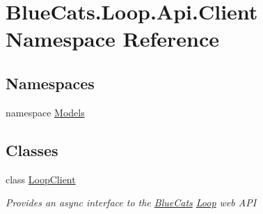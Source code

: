 \hypertarget{namespace_blue_cats_1_1_loop_1_1_api_1_1_client}{}\section{Blue\+Cats.\+Loop.\+Api.\+Client Namespace Reference}
\label{namespace_blue_cats_1_1_loop_1_1_api_1_1_client}
\subsection*{Namespaces}
\begin{DoxyCompactItemize}
\item 
namespace \mbox{\hyperlink{namespace_blue_cats_1_1_loop_1_1_api_1_1_client_1_1_models}{Models}}
\end{DoxyCompactItemize}
\subsection*{Classes}
\begin{DoxyCompactItemize}
\item 
class \mbox{\hyperlink{class_blue_cats_1_1_loop_1_1_api_1_1_client_1_1_loop_client}{Loop\+Client}}
\begin{DoxyCompactList}\small\item\em Provides an async interface to the \mbox{\hyperlink{namespace_blue_cats}{Blue\+Cats}} \mbox{\hyperlink{namespace_blue_cats_1_1_loop}{Loop}} web A\+PI \end{DoxyCompactList}\end{DoxyCompactItemize}
